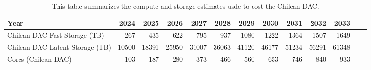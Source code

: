 \tiny \begin{longtable} { |p{}  |r  |r  |r  |r  |r  |r  |r  |r  |r  |r  |r  |r |} 
\caption{This table summarizes the compute and storage estimates usde to cost the Chilean DAC. \label{tab:chileDac}}\\ 
\hline 
\textbf{Year}&\textbf{2024}&\textbf{2025}&\textbf{2026}&\textbf{2027}&\textbf{2028}&\textbf{2029}&\textbf{2030}&\textbf{2031}&\textbf{2032}&\textbf{2033}& \\ \hline
{Chilean DAC Fast Storage (TB)}&{267}&{435}&{622}&{795}&{937}&{1080}&{1222}&{1364}&{1507}&{1649}&{ } \\ \hline
{Chilean DAC Latent Storage (TB)}&{10500}&{18391}&{25950}&{31007}&{36063}&{41120}&{46177}&{51234}&{56291}&{61348}& \\ \hline
{Cores (Chilean DAC)}&{103}&{187}&{280}&{373}&{466}&{560}&{653}&{746}&{840}&{933}& \\ \hline
\end{longtable} \normalsize
